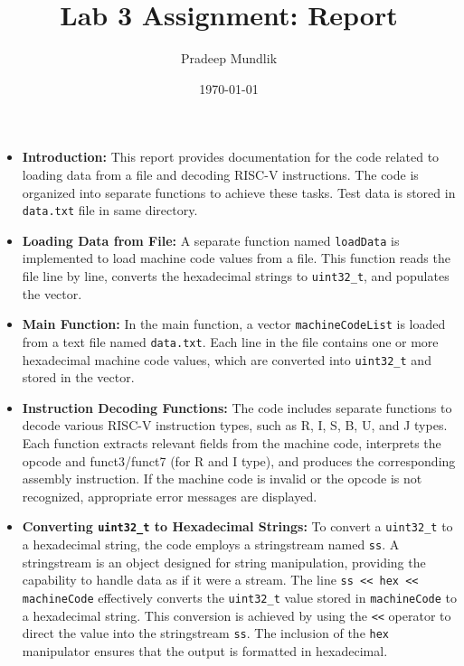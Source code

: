 \documentclass{article}
\begin{document}
\title{Lab 3 Assignment: Report}
\author{Pradeep Mundlik}
\date{\today}
\maketitle

\begin{itemize}
    \item \textbf{Introduction:} This report provides documentation for the code related to loading data from a file and decoding RISC-V instructions. The code is organized into separate functions to achieve these tasks. Test data is stored in \texttt{data.txt} file in same directory.

    \item \textbf{Loading Data from File:} A separate function named \texttt{loadData} is implemented to load machine code values from a file. This function reads the file line by line, converts the hexadecimal strings to \texttt{uint32\_t}, and populates the vector.

    \item \textbf{Main Function:} In the main function, a vector \texttt{machineCodeList} is loaded from a text file named \texttt{data.txt}. Each line in the file contains one or more hexadecimal machine code values, which are converted into \texttt{uint32\_t} and stored in the vector.

    \item \textbf{Instruction Decoding Functions:} The code includes separate functions to decode various RISC-V instruction types, such as R, I, S, B, U, and J types. Each function extracts relevant fields from the machine code, interprets the opcode and funct3/funct7 (for R and I type), and produces the corresponding assembly instruction. If the machine code is invalid or the opcode is not recognized, appropriate error messages are displayed.

    \item \textbf{Converting \texttt{uint32\_t} to Hexadecimal Strings:} To convert a \texttt{uint32\_t} to a hexadecimal string, the code employs a stringstream named \texttt{ss}. A stringstream is an object designed for string manipulation, providing the capability to handle data as if it were a stream.
    The line \texttt{ss << hex << machineCode} effectively converts the \texttt{uint32\_t} value stored in \texttt{machineCode} to a hexadecimal string. 
    This conversion is achieved by using the \texttt{<<} operator to direct the value into the stringstream \texttt{ss}. The inclusion of the \texttt{hex} manipulator ensures that the output is formatted in hexadecimal.


\end{itemize}
\end{document}
